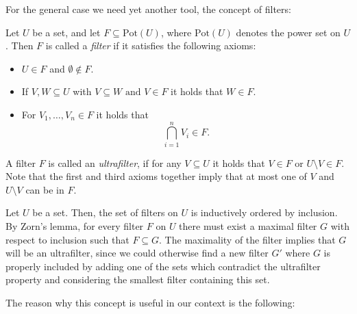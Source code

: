 For the general case we need yet another tool, the concept of filters:

\begin{defn}
Let $U$ be a set, and let $F \subseteq \text{Pot}(U)$, where $\text{Pot}(U)$ denotes the power set on $U$. Then $F$ is called a \emph{filter} if it satisfies the following axioms: 
\begin{itemize}
\item  $U \in F$ and $\emptyset \notin F$.
\item If $V,W \subseteq U$ with $V \subseteq W \text{ and }V  \in F $ it holds that $W \in F$.
\item For $V_1, \ldots, V_n \in F$ it holds that \[ \bigcap_{i = 1}^n V_i \in F. \]
\end{itemize}
A filter $F$ is called an \emph{ultrafilter}, if for any $V \subseteq U$ it holds that $V \in F$ or $U \setminus V \in F$. Note that the first and third axioms together imply that at most one of $V$ and $U \setminus V$ can be in $F$.
\end{defn}



\begin{rem}
Let $U$ be a set. Then, the set of filters on $U$ is inductively ordered by inclusion. By Zorn's lemma, for every filter $F$ on $U$ there must exist a maximal filter $G$ with respect to inclusion such that $F \subseteq G$.
The maximality of the filter implies that $G$ will be an ultrafilter, since we could otherwise find a new filter $G'$ where $G$ is properly included by adding one of the sets which contradict the ultrafilter property and considering the smallest filter containing this set.
\end{rem}

The reason why this concept is useful in our context is the following:

